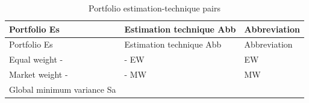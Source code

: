 \documentclass[
]{article}
\begin{document}
\begin{longtable}[]{@{}lll@{}}
\caption{\label{tab:portestpairs} Portfolio estimation-technique pairs}\tabularnewline
\toprule
\begin{minipage}[b]{0.27\columnwidth}\raggedright
Portfolio \textbar{} Es\strut
\end{minipage} & \begin{minipage}[b]{0.50\columnwidth}\raggedright
Estimation technique \textbar{} Abb\strut
\end{minipage} & \begin{minipage}[b]{0.14\columnwidth}\raggedright
Abbreviation\strut
\end{minipage}\tabularnewline
\midrule
\endfirsthead
\toprule
\begin{minipage}[b]{0.27\columnwidth}\raggedright
Portfolio \textbar{} Es\strut
\end{minipage} & \begin{minipage}[b]{0.50\columnwidth}\raggedright
Estimation technique \textbar{} Abb\strut
\end{minipage} & \begin{minipage}[b]{0.14\columnwidth}\raggedright
Abbreviation\strut
\end{minipage}\tabularnewline
\midrule
\endhead
\begin{minipage}[t]{0.27\columnwidth}\raggedright
Equal weight \textbar{} -\strut
\end{minipage} & \begin{minipage}[t]{0.50\columnwidth}\raggedright
- \textbar{} EW\strut
\end{minipage} & \begin{minipage}[t]{0.14\columnwidth}\raggedright
EW\strut
\end{minipage}\tabularnewline
\begin{minipage}[t]{0.27\columnwidth}\raggedright
Market weight \textbar{} -\strut
\end{minipage} & \begin{minipage}[t]{0.50\columnwidth}\raggedright
- \textbar{} MW\strut
\end{minipage} & \begin{minipage}[t]{0.14\columnwidth}\raggedright
MW\strut
\end{minipage}\tabularnewline
\begin{minipage}[t]{0.27\columnwidth}\raggedright
Global minimum variance \textbar{} Sa\strut
\end{minipage} & \begin{minipage}[t]{0.50\columnwidth}\raggedright

\end{minipage}
\end{longtable}
\end{document}
